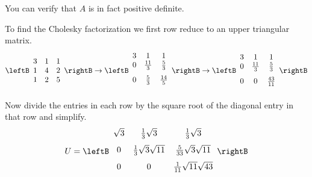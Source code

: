 \begin{solution}
You can verify that $A$ is in fact positive definite. 

To find the Cholesky factorization we first row reduce to an upper triangular matrix. 
\[
\leftB
\begin{array}{ccc}
3 & 1 & 1 \\ 
1 & 4 & 2 \\ 
1 & 2 & 5
\end{array}
\rightB
\rightarrow
\leftB 
\begin{array}{ccc}
3 & 1 & 1 \\ 
0 & \vspace{0.05in}\frac{11}{3} & \vspace{0.05in}\frac{5}{3} \\ 
0 & \vspace{0.05in}\frac{5}{3}  & \vspace{0.05in}\frac{14}{5}
\end{array}
\rightB
\rightarrow
\leftB 
\begin{array}{ccc}
3 & 1 & 1 \\ 
0 & \vspace{0.05in}\frac{11}{3} & \vspace{0.05in}\frac{5}{3} \\ 
0 & 0 & \vspace{0.05in}\frac{43}{11}
\end{array}
\rightB
\]

Now divide the entries in each row by the square root of the diagonal entry in that row and simplify.
\[
U = \leftB 
\begin{array}{ccc}
\sqrt{3} & \vspace{0.05in}\frac{1}{3}\sqrt{3} & \vspace{0.05in}\frac{1}{3}\sqrt{3}  \\ 
0  & \vspace{0.05in}\frac{1}{3}\sqrt{3}\sqrt{11} &  \vspace{0.05in}\frac{5}{33}\sqrt{3}\sqrt{11} \\ 

0  & 0 & \vspace{0.05in}\frac{1}{11}\sqrt{11}\sqrt{43}
\end{array}
\rightB
\]
\end{solution}